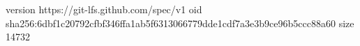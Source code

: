 version https://git-lfs.github.com/spec/v1
oid sha256:6dbf1c20792cfbf346ffa1ab5f6313066779dde1cdf7a3e3b9ce96b5ccc88a60
size 14732
